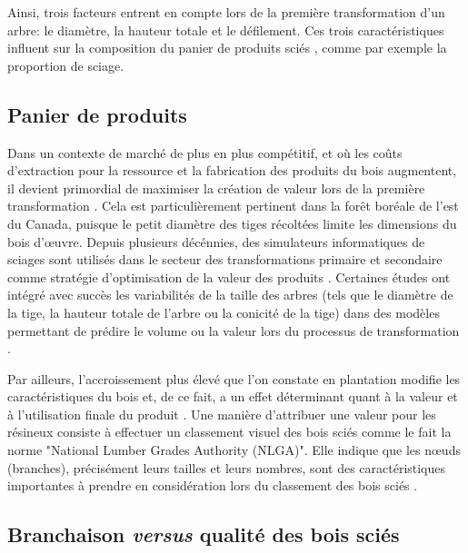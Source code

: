 \documentclass[letterpaper, 12pt]{article}
\begin{document}
\begin{onehalfspace}
\vspace{12pt}

Ainsi, trois facteurs entrent en compte lors de la première transformation d'un arbre: le diamètre, la hauteur totale et le défilement. Ces trois caractéristiques influent sur la composition du panier de produits sciés \cite{Auty2014}, comme par exemple la proportion de sciage.

\subsection{Panier de produits}

Dans un contexte de marché de plus en plus compétitif, et où les coûts d'extraction pour la ressource et la fabrication des produits du bois augmentent, il devient primordial de maximiser la création de valeur lors de la première transformation \cite{Briggs2010, Walker2013}. Cela est particulièrement pertinent dans la forêt boréale de l'est du Canada, puisque le petit diamètre des tiges récoltées limite les dimensions du bois d'œuvre. Depuis plusieurs décénnies, des simulateurs informatiques de sciages sont utilisés dans le secteur des transformations primaire et secondaire comme stratégie d'optimisation de la valeur des produits \cite{FPInnovations2014}. Certaines études ont intégré avec succès les variabilités de la taille des arbres (tels que le diamètre de la tige, la hauteur totale de l’arbre ou la conicité de la tige) dans des modèles permettant de prédire le volume ou la valeur lors du processus de transformation \cite{Barrette2012,Liu2007}.

\vspace{12pt}

Par ailleurs, l'accroissement plus élevé que l'on constate en plantation modifie les caractéristiques du bois et, de ce fait, a un effet déterminant quant à la valeur et à l'utilisation finale du produit \cite{Zhang2002}. Une manière d'attribuer une valeur pour les résineux consiste à effectuer un classement visuel des bois sciés comme le fait la norme "National Lumber Grades Authority (NLGA)". Elle indique que les nœuds (branches), précisément leurs tailles et leurs nombres, sont des caractéristiques importantes à prendre en considération lors du classement des bois sciés \cite{Lemieux2000}.

\subsection{Branchaison \textit{versus} qualité des bois sciés}


\end{onehalfspace}
\end{document}
